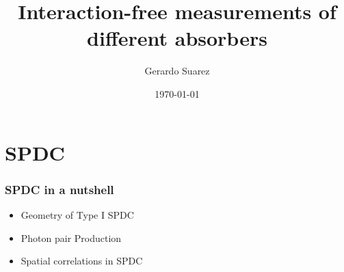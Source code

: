 \documentclass[]{beamer}
\title{Interaction-free measurements of different absorbers}    %
\author{Gerardo Suarez}                 %
\institute{Physics Department,\\ CINVESTAV}      %
\date{\today}                    %
\begin{document}
\begin{frame}
  \titlepage
\end{frame}

\section[Outline]{}

\begin{frame}
  \tableofcontents
\end{frame}


\section{SPDC}

\begin{frame}
  \frametitle{SPDC in a nutshell}   %

  \begin{itemize}
  \item Geometry of Type I SPDC
  \item Photon pair Production
  \item Spatial correlations in SPDC
  \end{itemize}
\end{frame}
\end{document}
